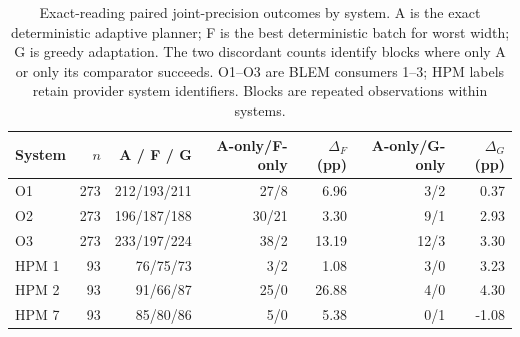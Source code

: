 \begin{table}[htbp]
\centering\small
\setlength{\tabcolsep}{4pt}
\begin{tabular}{lrrrrrr}
\toprule
System & $n$ & A / F / G & A-only/F-only & $\Delta_F$ (pp) & A-only/G-only & $\Delta_G$ (pp)\\
\midrule
O1 & 273 & 212/193/211 & 27/8 & 6.96 & 3/2 & 0.37\\
O2 & 273 & 196/187/188 & 30/21 & 3.30 & 9/1 & 2.93\\
O3 & 273 & 233/197/224 & 38/2 & 13.19 & 12/3 & 3.30\\
HPM 1 & 93 & 76/75/73 & 3/2 & 1.08 & 3/0 & 3.23\\
HPM 2 & 93 & 91/66/87 & 25/0 & 26.88 & 4/0 & 4.30\\
HPM 7 & 93 & 85/80/86 & 5/0 & 5.38 & 0/1 & -1.08\\
\bottomrule
\end{tabular}
\caption{Exact-reading paired joint-precision outcomes by system. A is the exact deterministic adaptive planner; F is the best deterministic batch for worst width; G is greedy adaptation. The two discordant counts identify blocks where only A or only its comparator succeeds. O1--O3 are BLEM consumers 1--3; HPM labels retain provider system identifiers. Blocks are repeated observations within systems.}
\label{tab:joint_system_effects}
\end{table}
